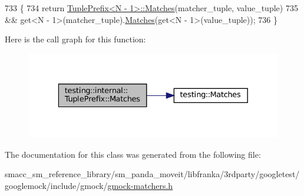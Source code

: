 \begin{DoxyCode}
733                                                      \{
734     \textcolor{keywordflow}{return} \hyperlink{classtesting_1_1internal_1_1TuplePrefix_ada24ceee73c02e3bb7f8264143170f7a}{TuplePrefix<N - 1>::Matches}(matcher\_tuple, value\_tuple)
735         && \textcolor{keyword}{get}<N - 1>(matcher\_tuple).\hyperlink{classtesting_1_1internal_1_1TuplePrefix_ada24ceee73c02e3bb7f8264143170f7a}{Matches}(get<N - 1>(value\_tuple));
736   \}
\end{DoxyCode}
Here is the call graph for this function\+:
\nopagebreak
\begin{figure}[H]
\begin{center}
\leavevmode
\includegraphics[width=329pt]{classtesting_1_1internal_1_1TuplePrefix_ada24ceee73c02e3bb7f8264143170f7a_cgraph}
\end{center}
\end{figure}


The documentation for this class was generated from the following file\+:\begin{DoxyCompactItemize}
\item 
smacc\+\_\+sm\+\_\+reference\+\_\+library/sm\+\_\+panda\+\_\+moveit/libfranka/3rdparty/googletest/googlemock/include/gmock/\hyperlink{gmock-matchers_8h}{gmock-\/matchers.\+h}\end{DoxyCompactItemize}
